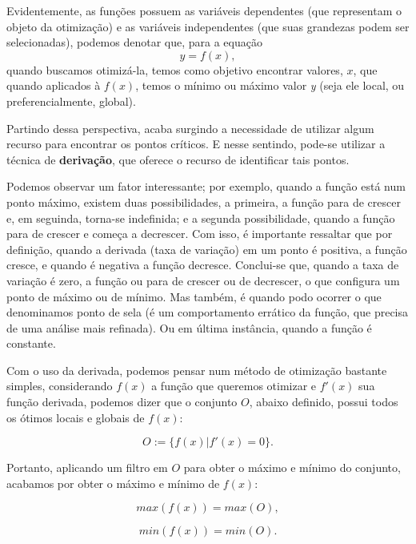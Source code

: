 Evidentemente, as funções possuem as variáveis dependentes (que representam o
objeto da otimização) e as variáveis independentes (que suas grandezas podem
ser selecionadas), podemos denotar que, para a equação
\begin{equation}
	y = f(x),
\end{equation}
quando buscamos otimizá-la, temos como objetivo encontrar valores, \(x\), que
quando aplicados à \(f(x)\), temos o mínimo ou máximo valor \textit{y} (seja
ele local, ou preferencialmente, global).

Partindo dessa perspectiva, acaba surgindo a necessidade de utilizar algum
recurso para encontrar os pontos críticos. E nesse sentindo, pode-se utilizar
a técnica de \textbf{derivação}, que oferece o recurso de identificar tais
pontos.


Podemos observar um fator interessante; por exemplo,
quando a função está num ponto máximo, existem duas possibilidades, a primeira,
a função para de crescer e, em seguinda, torna-se indefinida; e a
segunda possibilidade, quando a função para de crescer e começa a decrescer.
Com isso, é importante ressaltar que por definição, quando a derivada (taxa de
variação) em um ponto é positiva, a função cresce, e quando é negativa a função
decresce. Conclui-se que, quando a taxa de variação é zero, a função ou para de
crescer ou de decrescer, o que configura um ponto de máximo ou de mínimo. Mas
também, é quando podo ocorrer o que denominamos ponto de sela (é um
comportamento errático da função, que precisa de uma análise mais refinada). Ou
em última instância, quando a função é constante.

Com o uso da derivada, podemos pensar num método de otimização bastante simples,
considerando \(f(x)\) a função que queremos otimizar e \(f'(x)\) sua função
derivada, podemos dizer que o conjunto $O$, abaixo definido, possui todos os ótimos locais e
globais de \(f(x)\):

\begin{equation}
    O := \{f(x) | f'(x) = 0\}.
    \label{equacao_conjunto_o}
\end{equation}


Portanto, aplicando um filtro em $O$ para obter o máximo e mínimo do conjunto,
acabamos por obter o máximo e mínimo de \(f(x)\):


\begin{equation}
    max(f(x)) = max(O),
\end{equation}

\begin{equation}
    min(f(x)) = min(O).
\end{equation}



